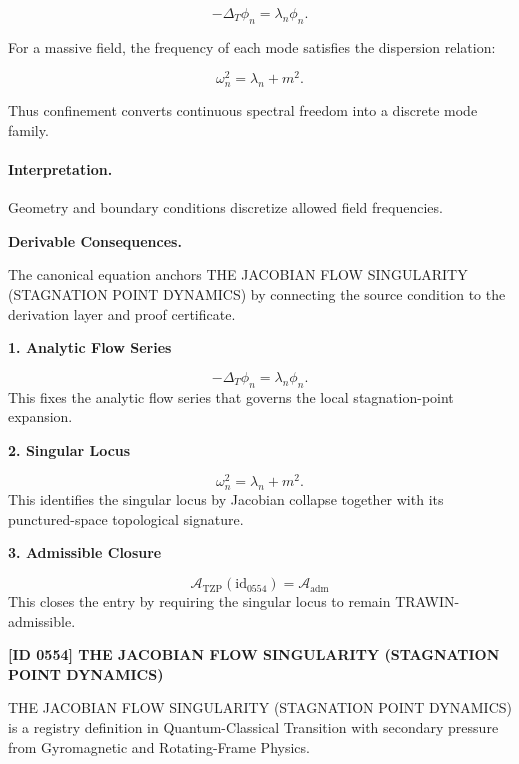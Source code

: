 \begin{equation}
-\Delta_T \phi_n = \lambda_n\phi_n .
\end{equation}

For a massive field, the frequency of each mode satisfies the dispersion relation:

\begin{equation}
\omega_n^2=\lambda_n+m^2 .
\end{equation}

Thus confinement converts continuous spectral freedom into a discrete mode family.

\paragraph{Interpretation.}
Geometry and boundary conditions discretize allowed field frequencies.

\par\vspace{0.35em}
\noindent\textbf{Derivable Consequences.}\quad
\begingroup
\footnotesize
\raggedright
The canonical equation anchors THE JACOBIAN FLOW SINGULARITY (STAGNATION POINT DYNAMICS) by connecting the source condition to the derivation layer and proof certificate.
\par\endgroup

\noindent\textbf{1. Analytic Flow Series}\par
\[
-\Delta_T \phi_n = \lambda_n \phi_n.
\]
\noindent This fixes the analytic flow series that governs the local stagnation-point expansion.\par
\noindent\textbf{2. Singular Locus}\par
\[
\omega_n^2 = \lambda_n + m^2.
\]
\noindent This identifies the singular locus by Jacobian collapse together with its punctured-space topological signature.\par
\noindent\textbf{3. Admissible Closure}\par
\[
\mathcal{A}_{\mathrm{TZP}}(\mathrm{id}_{0554})=\mathcal{A}_{\mathrm{adm}}
\]
\noindent This closes the entry by requiring the singular locus to remain TRAWIN-admissible.\par

\clearpage
\noindent\textbf{[ID 0554] THE JACOBIAN FLOW SINGULARITY (STAGNATION POINT DYNAMICS)}\par
\vspace{0.35em}
\begingroup\small
{}
THE JACOBIAN FLOW SINGULARITY (STAGNATION POINT DYNAMICS) is a registry definition in Quantum-Classical Transition with secondary pressure from Gyromagnetic and Rotating-Frame Physics.

